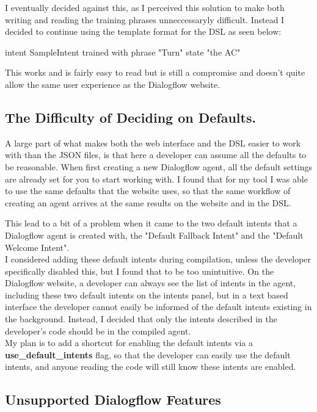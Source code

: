 I eventually decided against this, as I perceived this solution to make both writing and reading the training phrases unneccessaryly difficult. Instead I decided to continue using the template format for the DSL as seen below:

\begin{DSL}
    intent SampleIntent
        trained with phrase
            "Turn" state "the AC"
\end{DSL}

This works and is fairly easy to read but is still a compromise and doesn't quite allow the same user experience as the Dialogflow website.

\subsection{The Difficulty of Deciding on Defaults.}

A large part of what makes both the web interface and the DSL easier to work with than the JSON files, is that here a developer can assume all the defaults to be reasonable. When first creating a new Dialogflow agent, all the default settings are already set for you to start working with. I found that for my tool I was able to use the same defaults that the website uses, so that the same workflow of creating an agent arrives at the same results on the website and in the DSL.

This lead to a bit of a problem when it came to the two default intents that a Dialogflow agent is created with, the "Default Fallback Intent" and the "Default Welcome Intent". \\
I considered adding these default intents during compilation, unless the developer specifically disabled this, but I found that to be too unintuitive. On the Dialogflow website, a developer can always see the list of intents in the agent, including these two default intents on the intents panel, but in a text based interface the developer cannot easily be informed of the default intents existing in the background. Instead, I decided that only the intents described in the developer's code should be in the compiled agent. \\
My plan is to add a shortcut for enabling the default intents via a \textbf{use\_default\_intents} flag, so that the developer can easily use the default intents, and anyone reading the code will still know these intents are enabled.

\subsection{Unsupported Dialogflow Features}

